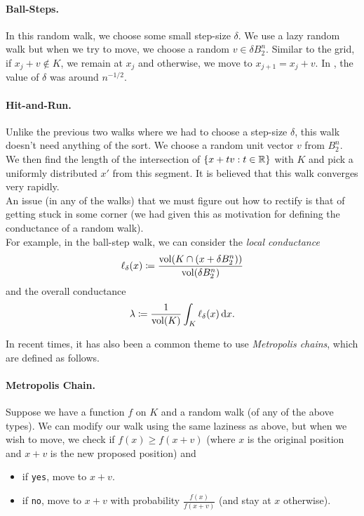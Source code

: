 \paragraph{Ball-Steps.}

In this random walk, we choose some small step-size $\delta$. We use a lazy random walk but when we try to move, we choose a random $v\in\delta B_2^n$. Similar to the grid, if $x_j+v\not\in K$, we remain at $x_j$ and otherwise, we move to $x_{j+1}=x_j+v$. In \cite{KLS-n5}, the value of $\delta$ was around $n^{-1/2}$.

\paragraph{Hit-and-Run.}

Unlike the previous two walks where we had to choose a step-size $\delta$, this walk doesn't need anything of the sort. We choose a random unit vector $v$ from $B_2^n$. We then find the length of the intersection of $\{x+tv:t\in\mathbb{R}\}$ with $K$ and pick a uniformly distributed $x'$ from this segment. It is believed that this walk converges very rapidly.\\

An issue (in any of the walks) that we must figure out how to rectify is that of getting stuck in some corner (we had given this as motivation for defining the conductance of a random walk).\\
For example, in the ball-step walk, we can consider the \textit{local conductance}
\[ \ell_\delta(x) \coloneqq \frac{\operatorname{vol}(K\cap (x+\delta B_2^n))}{\operatorname{vol}(\delta B_2^n)} \]
and the overall conductance
\[ \lambda\coloneqq \frac{1}{\operatorname{vol}(K)} \int_K \ell_\delta(x)\operatorname{d}\!{x}. \]

In recent times, it has also been a common theme to use \textit{Metropolis chains}, which are defined as follows.

\paragraph{Metropolis Chain.} Suppose we have a function $f$ on $K$ and a random walk (of any of the above types). We can modify our walk using the same laziness as above, but when we wish to move, we check if $f(x)\geq f(x+v)$ (where $x$ is the original position and $x+v$ is the new proposed position) and
\begin{itemize}
	\item if \texttt{yes}, move to $x+v$.
	\item if \texttt{no}, move to $x+v$ with probability $\frac{f(x)}{f(x+v)}$ (and stay at $x$ otherwise).
\end{itemize}

